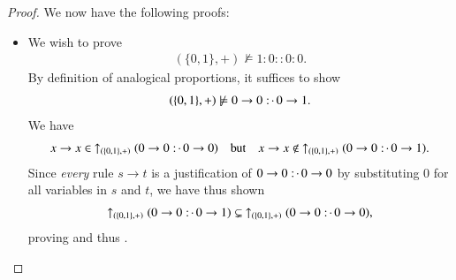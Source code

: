 \documentclass[11pt]{amsart}
\theoremstyle{definition} %
\newcommand{\righttherefore}{:\joinrel\cdot\,}
\begin{document}
\begin{proof}
We now have the following proofs:
\begin{itemize}
\item We wish to prove
\begin{align}\label{equ:y_+_not_models_1000}
	(\{0,1\},+)\not\models 1:0::0:0.
\end{align} By definition of analogical proportions, it suffices to show
\begin{align}\label{equ:y_+_not_models_0001} 
	(\{0,1\},+)\not\models 0\to 0 \righttherefore 0\to 1.
\end{align} We have
\begin{align*} 
	x\to x\in\ \uparrow_{(\{0,1\},+)}(0\to 0 \righttherefore 0\to 0) \quad\text{but}\quad x\to x\not\in\ \uparrow_{(\{0,1\},+)}(0\to 0 \righttherefore 0\to 1).
\end{align*} Since \textit{every} rule $s\to t$ is a justification of $0\to 0 \righttherefore 0\to 0$ by substituting $0$ for all variables in $s$ and $t$, we have thus shown
\begin{align*} 
	\uparrow_{(\{0,1\},+)}(0\to 0 \righttherefore 0\to 1)\subsetneq\ \uparrow_{(\{0,1\},+)}(0\to 0 \righttherefore 0\to 0),
\end{align*} proving  and thus .


\end{itemize}
\end{proof}
\end{document}
